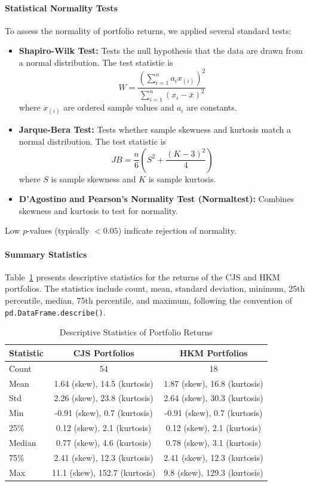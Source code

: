 \documentclass{article}
\begin{document}
\begin{appendices}
\paragraph{Statistical Normality Tests}
To assess the normality of portfolio returns, we applied several standard tests:
\begin{itemize}
  \item \textbf{Shapiro-Wilk Test:} Tests the null hypothesis that the data are drawn from a normal distribution. The test statistic is
  \[
  W = \frac{\left( \sum_{i=1}^n a_i x_{(i)} \right)^2}{\sum_{i=1}^n (x_i - \bar{x})^2}
  \]
  where $x_{(i)}$ are ordered sample values and $a_i$ are constants.
  \item \textbf{Jarque-Bera Test:} Tests whether sample skewness and kurtosis match a normal distribution. The test statistic is
  \[
  JB = \frac{n}{6} \left( S^2 + \frac{(K-3)^2}{4} \right)
  \]
  where $S$ is sample skewness and $K$ is sample kurtosis.
  \item \textbf{D'Agostino and Pearson's Normality Test (Normaltest):} Combines skewness and kurtosis to test for normality.
\end{itemize}
Low $p$-values (typically $<0.05$) indicate rejection of normality.

\paragraph{Summary Statistics}
Table~\ref{tab:portfolio_stats} presents descriptive statistics for the returns of the CJS and HKM portfolios. The statistics include count, mean, standard deviation, minimum, 25th percentile, median, 75th percentile, and maximum, following the convention of \texttt{pd.DataFrame.describe()}.

\begin{table}[H]
  \centering
  \caption{Descriptive Statistics of Portfolio Returns}
  \label{tab:portfolio_stats}
  \begin{tabular}{lcc}
    \toprule
    \textbf{Statistic} & \textbf{CJS Portfolios} & \textbf{HKM Portfolios} \\
    \midrule
    Count   & 54                          & 18                          \\
    Mean    & 1.64 (skew), 14.5 (kurtosis)  & 1.87 (skew), 16.8 (kurtosis) \\
    Std     & 2.26 (skew), 23.8 (kurtosis)  & 2.64 (skew), 30.3 (kurtosis) \\
    Min     & -0.91 (skew), 0.7 (kurtosis)  & -0.91 (skew), 0.7 (kurtosis) \\
    25\%    & 0.12 (skew), 2.1 (kurtosis)   & 0.12 (skew), 2.1 (kurtosis) \\
    \rowcolor{blue!20}
    Median  & 0.77 (skew), 4.6 (kurtosis)   & 0.78 (skew), 3.1 (kurtosis) \\
    75\%    & 2.41 (skew), 12.3 (kurtosis)  & 2.41 (skew), 12.3 (kurtosis) \\
    Max     & 11.1 (skew), 152.7 (kurtosis) & 9.8 (skew), 129.3 (kurtosis) \\
    \bottomrule
  \end{tabular}
\end{table}


\end{appendices}
\end{document}
